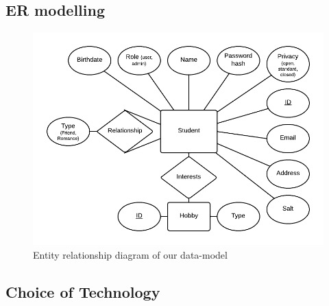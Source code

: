 \documentclass[a4paper]{article}
\begin{document}
\subsection{ER modelling}


\begin{figure}[h!]
\centering
\includegraphics[scale=0.5]{ER}
\caption{Entity relationship diagram of our data-model}
\label{fig:er_diagram}
\end{figure}



\subsection{Choice of Technology}
\end{document}
